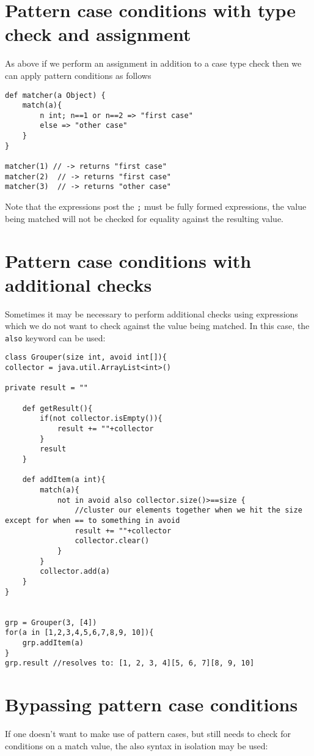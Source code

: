 \documentclass[conc-doc]{subfiles}
\begin{document}
\section{Pattern case conditions with type check and assignment}
As above if we perform an assignment in addition to a case type check then we can apply pattern conditions as follows

\begin{lstlisting}
def matcher(a Object) {
	match(a){
		n int; n==1 or n==2 => "first case"
		else => "other case"
	}
}

matcher(1) // -> returns "first case"
matcher(2)  // -> returns "first case"
matcher(3)  // -> returns "other case"
\end{lstlisting}

Note that the expressions post the \lstinline{;} must be fully formed expressions, the value being matched will not be checked for equality against the resulting value.

\section{Pattern case conditions with additional checks}
Sometimes it may be necessary to perform additional checks using expressions which we do not want to check against the value being matched. In this case, the \lstinline{also} keyword can be used:


\begin{lstlisting}
class Grouper(size int, avoid int[]){
collector = java.util.ArrayList<int>()

private result = ""

	def getResult(){
		if(not collector.isEmpty()){
			result += ""+collector 
		}
		result
	}

	def addItem(a int){
		match(a){
			not in avoid also collector.size()>==size {
				//cluster our elements together when we hit the size except for when == to something in avoid
				result += ""+collector
				collector.clear()
			}
		}
		collector.add(a)
	}
}


grp = Grouper(3, [4])
for(a in [1,2,3,4,5,6,7,8,9, 10]){
	grp.addItem(a)
}
grp.result //resolves to: [1, 2, 3, 4][5, 6, 7][8, 9, 10]
\end{lstlisting}

\section{Bypassing pattern case conditions}
If one doesn't want to make use of pattern cases, but still needs to check for conditions on a match value, the also syntax in isolation may be used:
\end{document}
